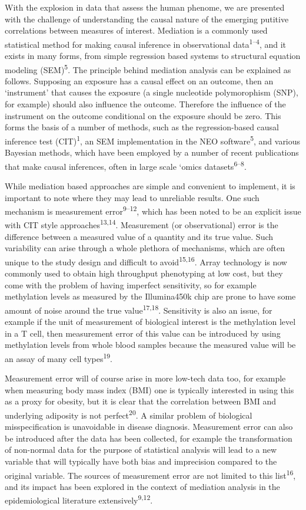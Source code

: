 \documentclass[]{article}
\begin{document}
With the explosion in data that assess the human phenome, we are
presented with the challenge of understanding the causal nature of the
emerging putitive correlations between measures of interest. Mediation
is a commonly used statistical method for making causal inference in
observational data\textsuperscript{1--4}, and it exists in many forms,
from simple regression based systems to structural equation modeling
(SEM)\textsuperscript{5}. The principle behind mediation analysis can be
explained as follows. Supposing an exposure has a causal effect on an
outcome, then an `instrument' that causes the exposure (a single
nucleotide polymorophism (SNP), for example) should also influence the
outcome. Therefore the influence of the instrument on the outcome
conditional on the exposure should be zero. This forms the basis of a
number of methods, such as the regression-based causal inference test
(CIT)\textsuperscript{1}, an SEM implementation in the NEO
software\textsuperscript{5}, and various Bayesian methods, which have
been employed by a number of recent publications that make causal
inferences, often in large scale `omics datasets\textsuperscript{6--8}.

While mediation based approaches are simple and convenient to implement,
it is important to note where they may lead to unreliable results. One
such mechanism is measurement error\textsuperscript{9--12}, which has
been noted to be an explicit issue with CIT style
approaches\textsuperscript{13,14}. Measurement (or observational) error
is the difference between a measured value of a quantity and its true
value. Such variability can arise through a whole plethora of
mechanisms, which are often unique to the study design and difficult to
avoid\textsuperscript{15,16}. Array technology is now commonly used to
obtain high throughput phenotyping at low cost, but they come with the
problem of having imperfect sensitivity, so for example methylation
levels as measured by the Illumina450k chip are prone to have some
amount of noise around the true value\textsuperscript{17,18}.
Sensitivity is also an issue, for example if the unit of measurement of
biological interest is the methylation level in a T cell, then
measurement error of this value can be introduced by using methylation
levels from whole blood samples because the measured value will be an
assay of many cell types\textsuperscript{19}.

Measurement error will of course arise in more low-tech data too, for
example when measuring body mass index (BMI) one is typically interested
in using this as a proxy for obesity, but it is clear that the
correlation between BMI and underlying adiposity is not
perfect\textsuperscript{20}. A similar problem of biological
misspecification is unavoidable in disease diagnosis. Measurement error
can also be introduced after the data has been collected, for example
the transformation of non-normal data for the purpose of statistical
analysis will lead to a new variable that will typically have both bias
and imprecision compared to the original variable. The sources of
measurement error are not limited to this list\textsuperscript{16}, and
its impact has been explored in the context of mediation analysis in the
epidemiological literature extensively\textsuperscript{9,12}.
\end{document}
